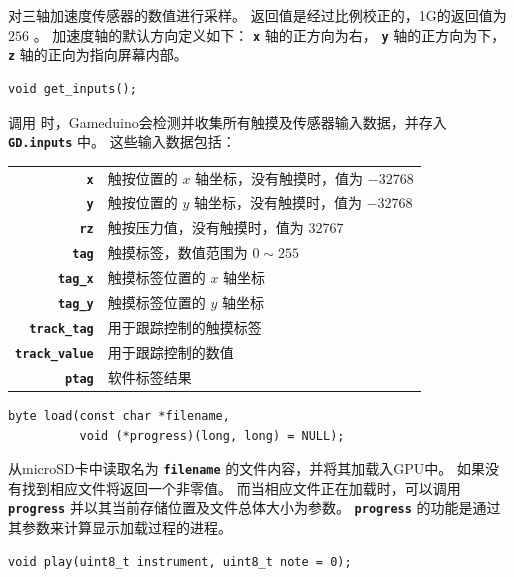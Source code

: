 \documentclass[10pt]{book}
\newcommand{\mach}[1]{\texttt{\textbf{#1}}}
\begin{document}
\begin{CJK}{UTF8}{gkai}
对三轴加速度传感器的数值进行采样。
返回值是经过比例校正的，1G的返回值为 $256$ 。
加速度轴的默认方向定义如下： \mach{x} 轴的正方向为右， \mach{y} 轴的正方向为下， \mach{z} 轴的正向为指向屏幕内部。


\begin{framed}
\begin{verbatim}
void get_inputs();
\end{verbatim}
\end{framed}

调用  时，Gameduino会检测并收集所有触摸及传感器输入数据，并存入 \mach{GD.inputs} 中。
这些输入数据包括：

\vspace{10pt}
\begin{tabular}{rl}
\mach{x} & 触按位置的 $x$ 轴坐标，没有触摸时，值为 $-32768$ \\
\mach{y} & 触按位置的 $y$ 轴坐标，没有触摸时，值为 $-32768$ \\
\mach{rz} & 触按压力值，没有触摸时，值为 $32767$ \\
\mach{tag} & 触摸标签，数值范围为 $0\sim255$ \\
\mach{tag\_x} & 触摸标签位置的 $x$ 轴坐标 \\
\mach{tag\_y} & 触摸标签位置的 $y$ 轴坐标 \\
\mach{track\_tag} & 用于跟踪控制的触摸标签 \\
\mach{track\_value} & 用于跟踪控制的数值\\
\mach{ptag} & 软件标签结果 \\
\end{tabular}


\begin{framed}
\begin{verbatim}
byte load(const char *filename,
          void (*progress)(long, long) = NULL);
\end{verbatim}
\end{framed}

从microSD卡中读取名为 \mach{filename} 的文件内容，并将其加载入GPU中。
如果没有找到相应文件将返回一个非零值。
而当相应文件正在加载时，可以调用 \mach{progress} 并以其当前存储位置及文件总体大小为参数。
\mach{progress} 的功能是通过其参数来计算显示加载过程的进程。


\begin{framed}
\begin{verbatim}
void play(uint8_t instrument, uint8_t note = 0);
\end{verbatim}
\end{framed}


\end{CJK}
\end{document}
